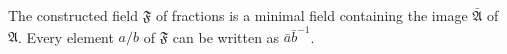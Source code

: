 The constructed field $\mathfrak{F}$ of fractions is a minimal field containing the image $\bar{\mathfrak{A}}$ of $\mathfrak{A}$. Every element $a/b$ of $\mathfrak{F}$ can be written as $\bar{a}\bar{b}^{-1}$.

